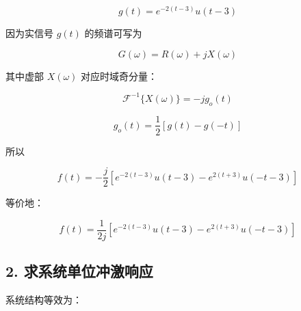 \documentclass[11pt]{ctexart}
\begin{document}
\[

g(t)=e^{-2(t-3)}u(t-3)

\]



因为实信号 \(g(t)\) 的频谱可写为\par



\[

G(\omega)=R(\omega)+jX(\omega)

\]



其中虚部 \(X(\omega)\) 对应时域奇分量：\par



\[

\mathcal{F}^{-1}\{X(\omega)\}=-j g_o(t)

\]



\[

g_o(t)=\frac12[g(t)-g(-t)]

\]



所以\par



\[

f(t)=

-\frac{j}{2}

\left[

e^{-2(t-3)}u(t-3)

-e^{2(t+3)}u(-t-3)

\right]

\]



等价地：\par



\[

f(t)=

\frac{1}{2j}

\left[

e^{-2(t-3)}u(t-3)

-e^{2(t+3)}u(-t-3)

\right]

\]



\subsection*{2. 求系统单位冲激响应}



系统结构等效为：\par
\end{document}
